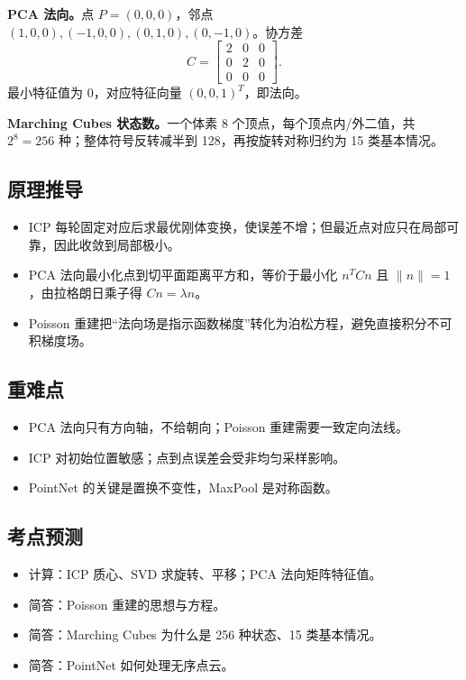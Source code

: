 \documentclass[UTF8,zihao=-4,scheme=chinese,fontset=fandol]{ctexart}
\begin{document}
\textbf{PCA 法向。}点 $P=(0,0,0)$，邻点 $(1,0,0),(-1,0,0),(0,1,0),(0,-1,0)$。协方差
\[
C=\begin{bmatrix}2&0&0\\0&2&0\\0&0&0\end{bmatrix}.
\]
最小特征值为 $0$，对应特征向量 $(0,0,1)^T$，即法向。

\textbf{Marching Cubes 状态数。}一个体素 8 个顶点，每个顶点内/外二值，共 $2^8=256$ 种；整体符号反转减半到 128，再按旋转对称归约为 15 类基本情况。

\subsection{原理推导}
\begin{itemize}
  \item ICP 每轮固定对应后求最优刚体变换，使误差不增；但最近点对应只在局部可靠，因此收敛到局部极小。
  \item PCA 法向最小化点到切平面距离平方和，等价于最小化 $n^TCn$ 且 $\|n\|=1$，由拉格朗日乘子得 $Cn=\lambda n$。
  \item Poisson 重建把“法向场是指示函数梯度”转化为泊松方程，避免直接积分不可积梯度场。
\end{itemize}

\subsection{重难点}
\begin{itemize}
  \item PCA 法向只有方向轴，不给朝向；Poisson 重建需要一致定向法线。
  \item ICP 对初始位置敏感；点到点误差会受非均匀采样影响。
  \item PointNet 的关键是置换不变性，MaxPool 是对称函数。
\end{itemize}

\subsection{考点预测}
\begin{itemize}
  \item 计算：ICP 质心、SVD 求旋转、平移；PCA 法向矩阵特征值。
  \item 简答：Poisson 重建的思想与方程。
  \item 简答：Marching Cubes 为什么是 256 种状态、15 类基本情况。
  \item 简答：PointNet 如何处理无序点云。
\end{itemize}
\end{document}
